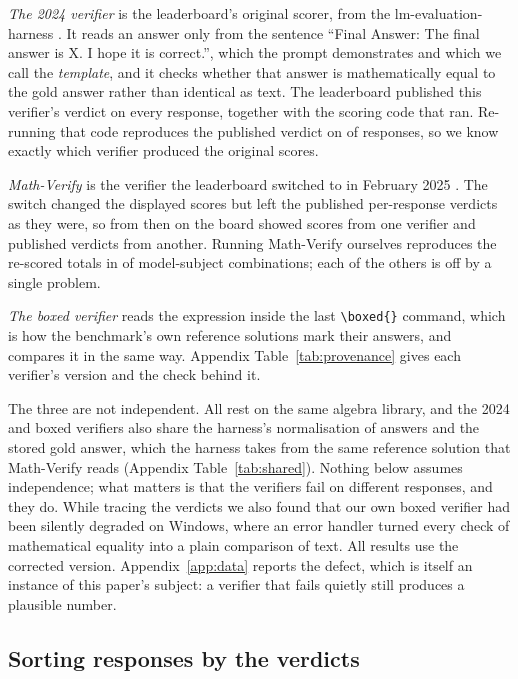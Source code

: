 \emph{The 2024 verifier} is the leaderboard's original scorer, from the lm-evaluation-harness
\citep{biderman2024lessons}. It reads an answer only from the sentence ``Final Answer: The final
answer is X. I hope it is correct.'', which the prompt demonstrates and which we call the
\emph{template}, and it checks whether that answer is mathematically equal to the gold answer
rather than identical as text. The leaderboard published this verifier's verdict on every response, together
with the scoring code that ran. Re-running that code reproduces the published verdict on
\EmReexecItems{} of \EmReexecItems{} responses, so we know exactly which verifier produced the
original scores.

\emph{Math-Verify} is the verifier the leaderboard switched to in February 2025
\citep{kydlicek2025fixing}. The switch changed the displayed scores but left the published
per-response verdicts as they were, so from then on the board showed scores from one verifier and
published verdicts from another. Running Math-Verify ourselves reproduces the re-scored totals in
\MvAggregateMatch{} of \NumSubjectsRescored{} model-subject combinations; each of the others is off
by a single problem.

\emph{The boxed verifier} reads the expression inside the last \texttt{\textbackslash boxed\{\}}
command, which is how the benchmark's own reference solutions mark their answers, and compares it
in the same way. Appendix Table~\ref{tab:provenance} gives each verifier's version and the check
behind it.

The three are not independent. All rest on the same algebra library, and the 2024 and boxed
verifiers also share the harness's normalisation of answers and the stored gold answer, which the
harness takes from the same reference solution that Math-Verify reads (Appendix
Table~\ref{tab:shared}). Nothing below assumes independence; what matters is that the verifiers fail
on different responses, and they do. While tracing the verdicts we also found that our own boxed
verifier had been silently degraded on Windows, where an error handler turned every check of
mathematical equality into a plain comparison of text. All results use the corrected version. Appendix~\ref{app:data}
reports the defect, which is itself an instance of this paper's subject: a verifier that fails
quietly still produces a plausible number.

\subsection{Sorting responses by the verdicts}

